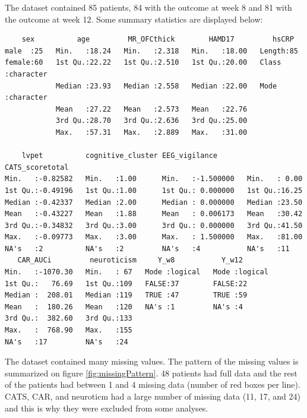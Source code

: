 \documentclass[12pt]{article}
\begin{document}
The dataset contained 85 patients, 84 with the outcome at week 8 and
81 with the outcome at week 12. Some summary statistics are displayed
below:
\begin{verbatim}
    sex          age         MR_OFCthick        HAMD17         hsCRP          
male  :25   Min.   :18.24   Min.   :2.318   Min.   :18.00   Length:85         
female:60   1st Qu.:22.22   1st Qu.:2.510   1st Qu.:20.00   Class :character  
            Median :23.93   Median :2.558   Median :22.00   Mode  :character  
            Mean   :27.22   Mean   :2.573   Mean   :22.76                     
            3rd Qu.:28.70   3rd Qu.:2.636   3rd Qu.:25.00                     
            Max.   :57.31   Max.   :2.889   Max.   :31.00                     

    lvpet          cognitive_cluster EEG_vigilance       CATS_scoretotal
Min.   :-0.82582   Min.   :1.00      Min.   :-1.500000   Min.   : 0.00  
1st Qu.:-0.49196   1st Qu.:1.00      1st Qu.: 0.000000   1st Qu.:16.25  
Median :-0.42337   Median :2.00      Median : 0.000000   Median :23.50  
Mean   :-0.43227   Mean   :1.88      Mean   : 0.006173   Mean   :30.42  
3rd Qu.:-0.34832   3rd Qu.:3.00      3rd Qu.: 0.000000   3rd Qu.:41.50  
Max.   :-0.09773   Max.   :3.00      Max.   : 1.500000   Max.   :81.00  
NA's   :2          NA's   :2         NA's   :4           NA's   :11     
   CAR_AUCi         neuroticism     Y_w8           Y_w12        
Min.   :-1070.30   Min.   : 67   Mode :logical   Mode :logical  
1st Qu.:   76.69   1st Qu.:109   FALSE:37        FALSE:22       
Median :  208.01   Median :119   TRUE :47        TRUE :59       
Mean   :  180.26   Mean   :120   NA's :1         NA's :4        
3rd Qu.:  382.60   3rd Qu.:133                                  
Max.   :  768.90   Max.   :155                                  
NA's   :17         NA's   :24
\end{verbatim}

The dataset contained many missing values. The pattern of the missing
values is summarized on figure \autoref{fig:missingPattern}. 48 patients
had full data and the rest of the patients had between 1 and 4 missing
data (number of red boxes per line). CATS, CAR, and neuroticm had a
large number of missing data (11, 17, and 24) and this is why they
were excluded from some analyses.

\clearpage
\end{document}
